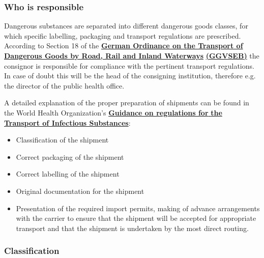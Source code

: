 \documentclass{article}
\begin{document}
\subsubsection{Who is responsible}\label{H7691848}



Dangerous substances are separated into different dangerous goods classes, for which specific labelling, packaging and transport regulations are prescribed. According to Section 18 of the \textbf{\href{https://www.bmvi.de/SharedDocs/DE/Anlage/G/Gefahrengut/ggvseb-2019-engl.pdf?__blob=publicationFile}{German Ordinance on the Transport of Dangerous Goods by Road, Rail and Inland Waterways}}\textbf{ }\textbf{\href{https://www.bmvi.de/SharedDocs/DE/Anlage/G/Gefahrengut/ggvseb-2019-engl.pdf?__blob=publicationFile}{(GGVSEB)}} the\textbf{ }consignor is responsible for compliance with the pertinent transport regulations. In case of doubt this will be the head of the consigning institution, therefore e.g. the director of the public health office.


A detailed explanation of the proper preparation of shipments can be found in the World Health Organization's \textbf{\href{https://www.who.int/csr/resources/publications/biosafety/WHO_HSE_EPR_2008_10.pdf}{Guidance on regulations for}}\href{https://www.who.int/csr/resources/publications/biosafety/WHO_HSE_EPR_2008_10.pdf}{ }\textbf{\href{https://www.who.int/csr/resources/publications/biosafety/WHO_HSE_EPR_2008_10.pdf}{the Transport of Infectious Substances}}:

\begin{itemize}
\item Classification of the shipment


\item Correct packaging of the shipment


\item Correct labelling of the shipment


\item Original documentation for the shipment


\item Presentation of the required import permits, making of advance arrangements with the carrier to ensure that the shipment will be accepted for appropriate transport and that the shipment is undertaken by the most direct routing.


\end{itemize}

\subsubsection{Classification}\label{H2334518}
\end{document}
